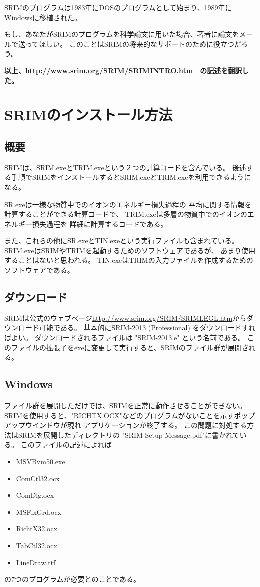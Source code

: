\documentclass [11pt,a4paper,dvipdfmx] {jarticle}
\begin{document}
SRIMのプログラムは1983年にDOSのプログラムとして始まり、1989年にWindowsに移植された。

もし、あなたがSRIMのプログラムを科学論文に用いた場合、著者に論文をメールで送ってほしい。
このことはSRIMの将来的なサポートのために役立つだろう。

{\bf 
以上、\url{http://www.srim.org/SRIM/SRIMINTRO.htm}　の記述を翻訳した。
}

\section{SRIMのインストール方法}
\subsection{概要}
SRIMは、SRIM.exeとTRIM.exeという２つの計算コードを含んでいる。
後述する手順でSRIMをインストールするとSRIM.exeとTRIM.exeを利用できるようになる。

SR.exeは一様な物質中でのイオンのエネルギー損失過程の
平均に関する情報を計算することができる計算コードで、
TRIM.exeは多層の物質中でのイオンのエネルギー損失過程を
詳細に計算するコードである。

また、これらの他にSR.exeとTIN.exeという実行ファイルも含まれている。
SRIM.exeはSRIMやTRIMを起動するためのソフトウェアであるが、
あまり使用することはないと思われる。
TIN.exeはTRIMの入力ファイルを作成するためのソフトウェアである。


\subsection{ダウンロード}
SRIMは公式のウェブページ\url{http://www.srim.org/SRIM/SRIMLEGL.htm}からダウンロード可能である。
基本的にSRIM-2013 (Professional) をダウンロードすればよい。
ダウンロードされるファイルは "SRIM-2013.e" という名前である。
このファイルの拡張子をexeに変更して実行すると、SRIMのファイル群が展開される。


\subsection{Windows}
ファイル群を展開しただけでは、SRIMを正常に動作させることができない。
SRIMを使用すると、"RICHTX.OCX"などのプログラムがないことを示すポップアップウインドウが現れ
アプリケーションが終了する。
この問題に対処する方法はSRIMを展開したディレクトリの
"SRIM Setup Message.pdf"に書かれている。
このファイルの記述によれば
\begin{itemize}
    \item MSVBvm50.exe
    \item ComCtl32.ocx
    \item ComDlg.ocx
    \item MSFlxGrd.ocx
    \item RichtX32.ocx
    \item TabCtl32.ocx
    \item LineDraw.ttf
\end{itemize}
の7つのプログラムが必要とのことである。
\end{document}
